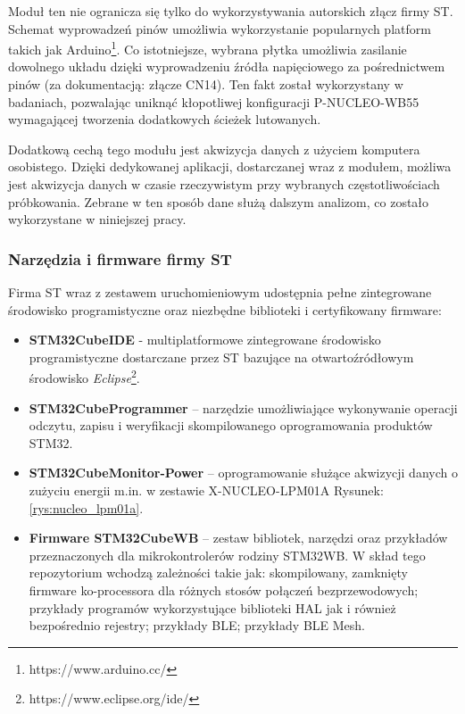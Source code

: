 Moduł ten nie ogranicza się tylko do wykorzystywania autorskich złącz firmy ST. Schemat wyprowadzeń pinów
umożliwia wykorzystanie popularnych platform takich jak Arduino\footnote{https://www.arduino.cc/}. Co istotniejsze, wybrana płytka umożliwia
zasilanie dowolnego układu dzięki wyprowadzeniu źródła napięciowego za pośrednictwem pinów 
(za dokumentacją: złącze CN14). Ten fakt został wykorzystany w badaniach, pozwalając uniknąć kłopotliwej
konfiguracji P-NUCLEO-WB55 wymagającej tworzenia dodatkowych ścieżek lutowanych.

Dodatkową cechą tego modułu jest akwizycja danych z użyciem komputera osobistego. Dzięki dedykowanej
aplikacji, dostarczanej wraz z modułem, możliwa jest akwizycja danych w czasie rzeczywistym przy
wybranych częstotliwościach próbkowania. Zebrane w ten sposób dane służą dalszym analizom, co zostało
wykorzystane w niniejszej pracy. 

\subsubsection{Narzędzia i firmware firmy ST}
Firma ST wraz z zestawem uruchomieniowym udostępnia pełne zintegrowane środowisko
programistyczne oraz niezbędne biblioteki i certyfikowany firmware:

\begin{itemize}
\item \textbf{STM32CubeIDE} \cite{noauthor_stm32cubeide_2022} - multiplatformowe zintegrowane środowisko programistyczne
dostarczane przez ST bazujące na otwartoźródłowym środowisko \textit{Eclipse}\footnote{https://www.eclipse.org/ide/}.
\item \textbf{STM32CubeProgrammer} \cite{noauthor_stm32cubeprog_2022} -- narzędzie umożliwiające wykonywanie operacji
odczytu, zapisu i weryfikacji skompilowanego oprogramowania produktów STM32. 
\item \textbf{STM32CubeMonitor-Power} \cite{noauthor_stm32cubemonpwr_2022} -- oprogramowanie służące akwizycji danych
o zużyciu energii m.in. w zestawie X-NUCLEO-LPM01A Rysunek: \ref{rys:nucleo_lpm01a}.
\item \textbf{Firmware STM32CubeWB} \cite{noauthor_stm32cubewb_2022} -- zestaw bibliotek, narzędzi oraz przykładów
przeznaczonych dla mikrokontrolerów rodziny STM32WB. W skład tego repozytorium wchodzą zależności takie jak:
skompilowany, zamknięty firmware ko-processora dla różnych stosów połączeń bezprzewodowych; przykłady programów
wykorzystujące biblioteki HAL jak i również bezpośrednio rejestry; przykłady BLE; przykłady BLE Mesh.
\end{itemize}


